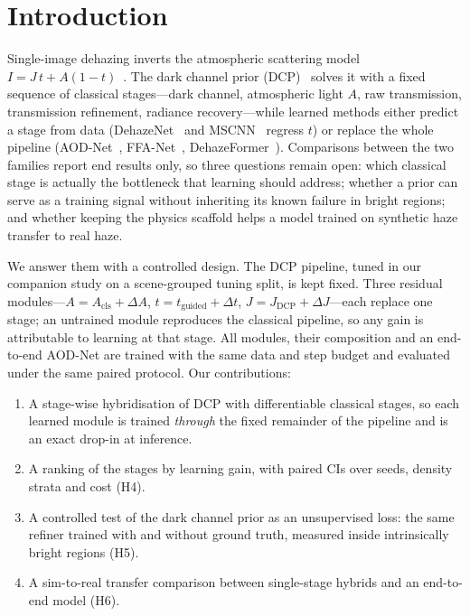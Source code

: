 \documentclass[conference]{IEEEtran}
\begin{document}
\section{Introduction}
Single-image dehazing inverts the atmospheric scattering model $I = J\,t + A(1-t)$~\cite{narasimhan2002}. The dark
channel prior (DCP)~\cite{he2009,he2011} solves it with a fixed sequence of classical stages---dark channel, atmospheric
light $A$, raw transmission, transmission refinement, radiance recovery---while learned methods either predict a stage
from data (DehazeNet~\cite{cai2016} and MSCNN~\cite{ren2016} regress $t$) or replace the whole pipeline
(AOD-Net~\cite{li2017}, FFA-Net~\cite{qin2020}, DehazeFormer~\cite{song2023}). Comparisons between the two families
report end results only, so three questions remain open: which classical stage is actually the bottleneck that
learning should address; whether a prior can serve as a training signal without inheriting its known failure in bright
regions; and whether keeping the physics scaffold helps a model trained on synthetic haze transfer to real haze.

We answer them with a controlled design. The DCP pipeline, tuned in our companion study on a scene-grouped tuning split,
is kept fixed. Three residual modules---$A = A_{\text{cls}} + \Delta A$, $t = t_{\text{guided}} + \Delta t$,
$J = J_{\text{DCP}} + \Delta J$---each replace one stage; an untrained module reproduces the classical pipeline, so any
gain is attributable to learning at that stage. All modules, their composition and an end-to-end AOD-Net are trained
with the same data and step budget and evaluated under the same paired protocol. Our contributions:
\begin{enumerate}
  \item A stage-wise hybridisation of DCP with differentiable classical stages, so each learned module is trained
        \emph{through} the fixed remainder of the pipeline and is an exact drop-in at inference.
  \item A ranking of the stages by learning gain, with paired CIs over seeds, density strata and cost (H4).
  \item A controlled test of the dark channel prior as an unsupervised loss: the same refiner trained with and
        without ground truth, measured inside intrinsically bright regions (H5).
  \item A sim-to-real transfer comparison between single-stage hybrids and an end-to-end model (H6).
\end{enumerate}
\end{document}

